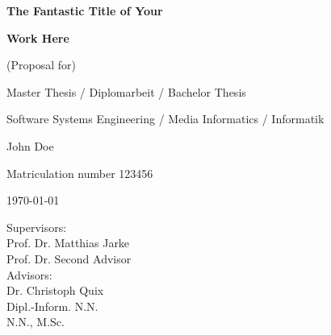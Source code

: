 \thispagestyle{empty}

\vspace*{3cm}
\centerline{{\Large\bf The Fantastic Title of Your}}

\vspace*{4mm}

\centerline{{\Large\bf Work Here}}

\vspace{2cm}

\centerline{(Proposal for)} %
\centerline{Master Thesis / Diplomarbeit / Bachelor Thesis}
\centerline{Software Systems Engineering / Media Informatics / Informatik }

\vspace{2cm}

\centerline{{\large John Doe}}
\centerline{Matriculation number 123456}

\vspace{10mm}

\centerline{\today}

\vspace{10mm}

\begin{center}
\begin{minipage}[t]{8cm}
Supervisors: \\
\hspace*{2cm} Prof. Dr. Matthias Jarke \\
\hspace*{2cm} Prof. Dr. Second Advisor\\[1cm]
Advisors: \\
\hspace*{2cm} Dr. Christoph Quix \\
\hspace*{2cm} Dipl.-Inform. N.N.\\
\hspace*{2cm} N.N., M.Sc.
\end{minipage}
\end{center}
